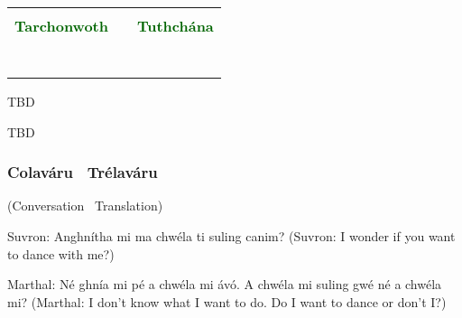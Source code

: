 \begin{table}[H]
\centering
    \begin{tabular}{cM{10.0cm}c}
     &  & \\
    \textcolor{darkgreen}{\textbf{Tarchonwoth}} &  & \textcolor{darkgreen}{\textbf{Tuthch\'{a}na}}\\
     &  & \\
     &  & \\
     &  & \\
     &  & \\
     &  & \\
     &  & \\
     &  & 
    \end{tabular}
\end{table}

\begingroup
\fontsize{10pt}{12pt}\selectfont
\begin{leftbubbles}TBD\end{leftbubbles}
\begin{rightbubbles}TBD\end{rightbubbles}
\endgroup

\newpage

\subsubsection{Colav\'{a}ru \textendash\ Tr\'{e}lav\'{a}ru}
(Conversation \textendash\ Translation)

Suvron: Anghn\'{i}tha mi ma chw\'{e}la ti suling canim?
(Suvron: I wonder if you want to dance with me?)

Marthal: N\'{e} ghn\'{i}a mi p\'{e} a chw\'{e}la mi \'{a}v\'{o}. A chw\'{e}la mi suling gw\'{e} n\'{e} a chw\'{e}la mi?
(Marthal: I don't know what I want to do. Do I want to dance or don't I?)

